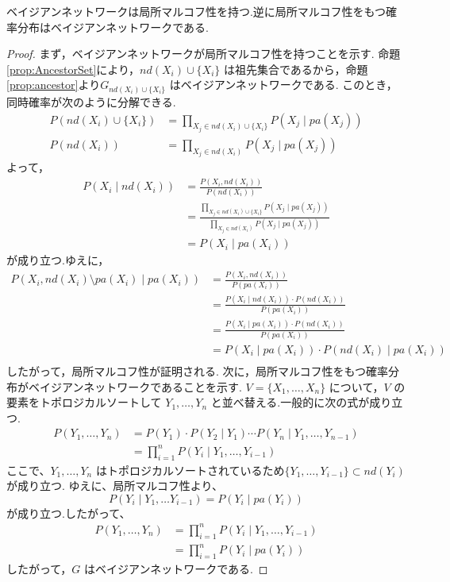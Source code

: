 \documentclass[uplatex, dvipdfmx]{jsarticle}
\begin{document}
\begin{prop}{}
  ベイジアンネットワークは局所マルコフ性を持つ.逆に局所マルコフ性をもつ確率分布はベイジアンネットワークである.
\end{prop}

\begin{proof}
  まず，ベイジアンネットワークが局所マルコフ性を持つことを示す.
  命題\ref{prop:AncestorSet}により，$nd(X_i) \cup \{X_i\}$ は祖先集合であるから，命題\ref{prop:ancestor}より$G_{nd(X_i) \cup \{X_i\}}$ はベイジアンネットワークである.
  このとき，同時確率が次のように分解できる.
  \begin{align}
      P(nd(X_i) \cup \{X_i\}) &= \prod_{X_j \in nd(X_i) \cup \{X_i\}} P(X_j \mid pa(X_j)) \\
      P(nd(X_i)) &= \prod_{X_j \in nd(X_i)} P(X_j \mid pa(X_j))
  \end{align}
  よって，
  \begin{align}
      P(X_i \mid nd(X_i)) &= \frac{P(X_i,nd(X_i))}{P(nd(X_i))} \\
      &= \frac{\prod_{X_j \in nd(X_i) \cup \{X_i\}} P(X_j \mid pa(X_j))}{\prod_{X_j \in nd(X_i)} P(X_j \mid pa(X_j))} \\
      &= P(X_i \mid pa(X_i))
  \end{align}
  が成り立つ.ゆえに，
  \begin{align}
      P(X_i, nd(X_i) \setminus pa(X_i) \mid pa(X_i)) &= \frac{P(X_i, nd(X_i))}{P(pa(X_i))} \\
      &= \frac{P(X_i \mid nd(X_i)) \cdot P(nd(X_i))}{P(pa(X_i))} \\
      &= \frac{P(X_i \mid pa(X_i)) \cdot P(nd(X_i))}{P(pa(X_i))} \\
      &= P(X_i \mid pa(X_i)) \cdot P(nd(X_i) \mid pa(X_i)) \\
  \end{align}
  したがって，局所マルコフ性が証明される.
  次に，局所マルコフ性をもつ確率分布がベイジアンネットワークであることを示す.
  $V = \{X_1, \dots, X_n\}$ について，$V$ の要素をトポロジカルソートして $Y_1, \dots, Y_n$ と並べ替える.一般的に次の式が成り立つ.
  \begin{align}
      P(Y_1, \dots, Y_n) &= P(Y_1) \cdot P(Y_2 \mid Y_1) \cdots P(Y_n \mid Y_1, \dots, Y_{n-1}) \\
      &= \prod_{i=1}^{n} P(Y_i \mid Y_1, \dots, Y_{i-1})
  \end{align}
  ここで、$Y_1, \dots, Y_n$ はトポロジカルソートされているため$\{Y_1, \dots, Y_{i-1}\} \subset nd(Y_i)$ が成り立つ.
  ゆえに、局所マルコフ性より、
  \begin{equation}
      P(Y_i \mid Y_1, \dots Y_{i-1}) = P(Y_i \mid pa(Y_i))
  \end{equation}
  が成り立つ.したがって、
  \begin{align}
    P(Y_1, \dots, Y_n) &= \prod_{i=1}^{n} P(Y_i \mid Y_1, \dots, Y_{i-1}) \\
     &= \prod_{i=1}^{n} P(Y_i \mid pa(Y_i))
  \end{align}  
  したがって，$G$ はベイジアンネットワークである.
\end{proof}
\end{document}
